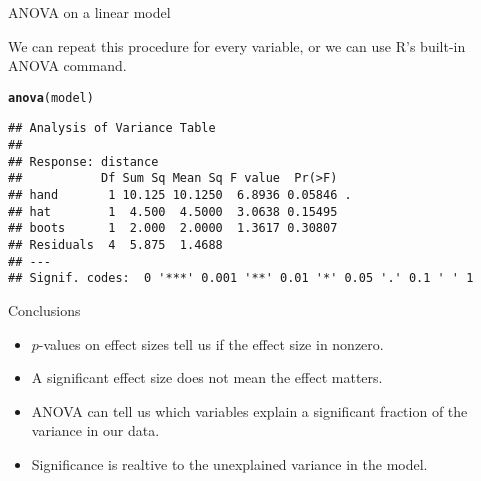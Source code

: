 \documentclass[10pt]{beamer}\usepackage[]{graphicx}\usepackage[]{color}
\makeatletter
\newcommand{\hlstd}[1]{\textcolor[rgb]{0.345,0.345,0.345}{#1}}%
\newcommand{\hlkwd}[1]{\textcolor[rgb]{0.737,0.353,0.396}{\textbf{#1}}}%
\newenvironment{kframe}{%
 \def\at@end@of@kframe{}%
 \ifinner\ifhmode%
  \def\at@end@of@kframe{\end{minipage}}%
  \begin{minipage}{\columnwidth}%
 \fi\fi%
 \def\FrameCommand##1{\hskip\@totalleftmargin \hskip-\fboxsep
 \colorbox{shadecolor}{##1}\hskip-\fboxsep
     \hskip-\linewidth \hskip-\@totalleftmargin \hskip\columnwidth}%
 \MakeFramed {\advance\hsize-\width
   \@totalleftmargin\z@ \linewidth\hsize
   \@setminipage}}%
 {\par\unskip\endMakeFramed%
 \at@end@of@kframe}
\newenvironment{knitrout}{}{} %
\makeatother
\begin{document}
\begin{frame}[fragile]{ANOVA on a linear model}

We can repeat this procedure for every variable, or we can use R's built-in ANOVA command.
\begin{knitrout}
\color{fgcolor}\begin{kframe}
\begin{alltt}
\hlkwd{anova}\hlstd{(model)}
\end{alltt}
\begin{verbatim}
## Analysis of Variance Table
## 
## Response: distance
##           Df Sum Sq Mean Sq F value  Pr(>F)  
## hand       1 10.125 10.1250  6.8936 0.05846 .
## hat        1  4.500  4.5000  3.0638 0.15495  
## boots      1  2.000  2.0000  1.3617 0.30807  
## Residuals  4  5.875  1.4688                  
## ---
## Signif. codes:  0 '***' 0.001 '**' 0.01 '*' 0.05 '.' 0.1 ' ' 1
\end{verbatim}
\end{kframe}
\end{knitrout}

\end{frame}

\begin{frame}{Conclusions}

\begin{itemize}
  \item $p$-values on effect sizes tell us if the effect size in nonzero.
  \item A significant effect size does not mean the effect matters.
  \item ANOVA can tell us which variables explain a significant fraction of the variance in our data.
  \item Significance is realtive to the unexplained variance in the model.
\end{itemize}

\end{frame}
\end{document}
